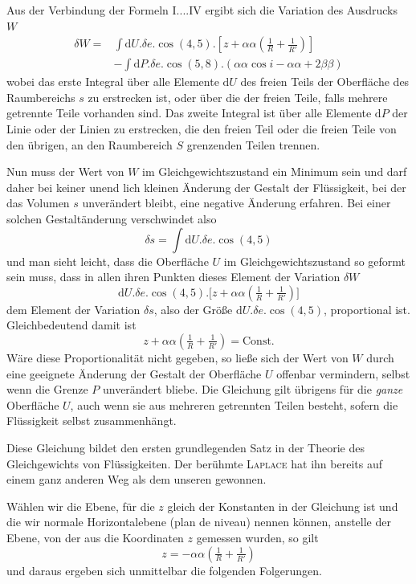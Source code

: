 Aus der Verbindung der Formeln I....IV ergibt sich die Variation des Ausdrucks $W$
\[
\begin{aligned}
\delta W={}&\int\mathrm{d}U.\delta e.\cos(4,5).[z+\alpha\alpha(\frac{1}{R}+\frac{1}{R'})]\\
&-\int\mathrm{d}P.\delta e.\cos(5,8).(\alpha\alpha\cos i-\alpha\alpha+2\beta\beta)
\end{aligned}
\]
wobei das erste Integral über alle Elemente $\mathrm{d}U$ des freien Teils der Oberfläche des Raumbereichs $s$ zu erstrecken ist, oder über die der freien Teile, falls mehrere getrennte Teile vorhanden sind. Das zweite Integral ist über alle Elemente $\mathrm{d}P$ der Linie oder der Linien zu erstrecken, die den freien Teil oder die freien Teile von den übrigen, an den Raumbereich $S$ grenzenden Teilen trennen.

Nun muss der Wert von $W$ im Gleichgewichtszustand ein Minimum sein und darf daher bei keiner unend%
lich kleinen Änderung der Gestalt der Flüssigkeit, bei der das Volumen $s$ unverändert bleibt, eine negative Änderung erfahren. Bei einer solchen Gestaltänderung verschwindet also
\[
\delta s=\int\mathrm{d}U.\delta e.\cos(4,5)
\]
und man sieht leicht, dass die Oberfläche $U$ im Gleichgewichtszustand so geformt sein muss, dass in allen ihren Punkten dieses Element der Variation $\delta W$
\[
\mathrm{d}U.\delta e.\cos(4,5).\bigl[z+\alpha\alpha(\tfrac1R+\tfrac1{R'})\bigr]
\]
dem Element der Variation $\delta s$, also der Größe $\mathrm{d}U.\delta e.\cos(4,5)$, proportional ist. Gleichbedeutend damit ist
\[
z+\alpha\alpha(\tfrac1R+\tfrac1{R'})=\mathrm{Const.}
\]
Wäre diese Proportionalität nicht gegeben, so ließe sich der Wert von $W$ durch eine geeignete Änderung der Gestalt der Oberfläche $U$ offenbar vermindern, selbst wenn die Grenze $P$ unverändert bliebe. Die Gleichung gilt übrigens für die \textit{ganze} Oberfläche $U$, auch wenn sie aus mehreren getrennten Teilen besteht, sofern die Flüssigkeit selbst zusammenhängt.

Diese Gleichung bildet den ersten grundlegenden Satz in der Theorie des Gleichgewichts von Flüssigkeiten. Der berühmte \textsc{Laplace} hat ihn bereits auf einem ganz anderen Weg als dem unseren gewonnen.

Wählen wir die Ebene, für die $z$ gleich der Konstanten in der Gleichung ist und die wir normale Horizontalebene (plan de niveau) nennen können, anstelle der Ebene, von der aus die Koordinaten $z$ gemessen wurden, so gilt
\[
z=-\alpha\alpha(\tfrac1R+\tfrac1{R'})
\]
und daraus ergeben sich unmittelbar die folgenden Folgerungen.

